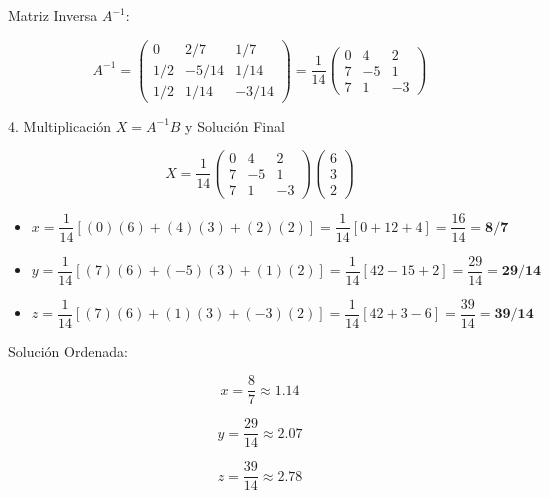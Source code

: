 \documentclass[10pt, aspectratio=169]{beamer}
\begin{document}
	
	\begin{frame}{Matriz Inversa $A^{-1}$:}

	
	\bigskip
	
	\[
	A^{-1} =
	\begin{pmatrix}
		0   &  2/7   &  1/7   \\
		1/2 & -5/14  &  1/14  \\
		1/2 &  1/14  & -3/14
	\end{pmatrix}
	= \dfrac{1}{14}
	\begin{pmatrix}
		0 &  4 &  2 \\
		7 & -5 &  1 \\
		7 &  1 & -3
	\end{pmatrix}
	\]
	
	\end{frame}
	\begin{frame}{4. Multiplicación $X = A^{-1}B$ y Solución Final}
		
			\[
		X = \dfrac{1}{14}
		\begin{pmatrix}
			0 &  4 &  2 \\
			7 & -5 &  1 \\
			7 &  1 & -3
		\end{pmatrix}
		\begin{pmatrix} 6 \\ 3 \\ 2 \end{pmatrix}
		\]
		
		\bigskip
		
		\begin{itemize}
			\item $x = \dfrac{1}{14}\left[(0)(6) + (4)(3) + (2)(2)\right]
			= \dfrac{1}{14}\left[0 + 12 + 4\right]
			= \dfrac{16}{14} = \mathbf{8/7}$
			
			\item $y = \dfrac{1}{14}\left[(7)(6) + (-5)(3) + (1)(2)\right]
			= \dfrac{1}{14}\left[42 - 15 + 2\right]
			= \dfrac{29}{14} = \mathbf{29/14}$
			
			\item $z = \dfrac{1}{14}\left[(7)(6) + (1)(3) + (-3)(2)\right]
			= \dfrac{1}{14}\left[42 + 3 - 6\right]
			= \dfrac{39}{14} = \mathbf{39/14}$
		\end{itemize}
		
		
	\end{frame}
\begin{frame}{Solución Ordenada:}
	
			
	\bigskip
	
	\[
	x = \dfrac{8}{7} \approx 1.14
	\]
	
	\[
	y = \dfrac{29}{14} \approx 2.07
	\]
	
	\[
	z = \dfrac{39}{14} \approx 2.78
	\]
	
	
\end{frame}	
	
\end{document}
